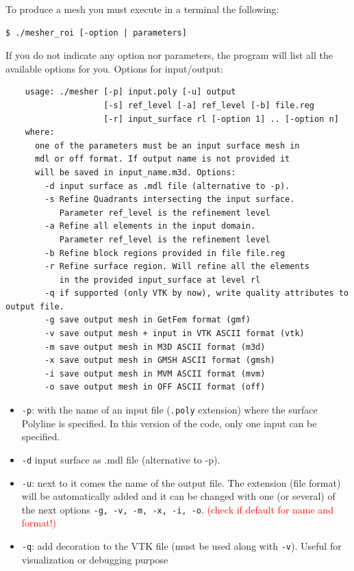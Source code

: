 \documentclass[10pt]{article}
\begin{document}
To produce a mesh you must execute in a terminal the following:
%
{\small
\begin{verbatim}
$ ./mesher_roi [-option | parameters]
\end{verbatim}
}
If you do not indicate any option nor parameters, the program will list all the available options for you. Options for input/output:
{\small
\begin{verbatim}
    usage: ./mesher [-p] input.poly [-u] output
                    [-s] ref_level [-a] ref_level [-b] file.reg
                    [-r] input_surface rl [-option 1] .. [-option n]
    where:
      one of the parameters must be an input surface mesh in
      mdl or off format. If output name is not provided it
      will be saved in input_name.m3d. Options:
        -d input surface as .mdl file (alternative to -p).
        -s Refine Quadrants intersecting the input surface.
           Parameter ref_level is the refinement level
        -a Refine all elements in the input domain.
           Parameter ref_level is the refinement level
        -b Refine block regions provided in file file.reg
        -r Refine surface region. Will refine all the elements
           in the provided input_surface at level rl
        -q if supported (only VTK by now), write quality attributes to output file.
        -g save output mesh in GetFem format (gmf)
        -v save output mesh + input in VTK ASCII format (vtk)
        -m save output mesh in M3D ASCII format (m3d)
        -x save output mesh in GMSH ASCII format (gmsh)
        -i save output mesh in MVM ASCII format (mvm)
        -o save output mesh in OFF ASCII format (off)
\end{verbatim}
}

\begin{itemize}
\item \texttt{-p}: with the name of an input file (\texttt{.poly} extension) where the surface Polyline is specified. In this version of the code, only one input can be specified.
\item  \texttt{-d} input surface as .mdl file (alternative to -p).
\item \texttt{-u}: next to it comes the name of the output file. The extension (file format) will be automatically added and  it can be changed with one (or several) of  the next options \texttt{-g, -v, -m, -x, -i, -o}. \textcolor{red}{(check if default for  name and format!)}
\item \texttt{-q}: add decoration to the VTK file (must be used along with \texttt{-v}). Useful for visualization or debugging purpose
\end{itemize}
\end{document}

